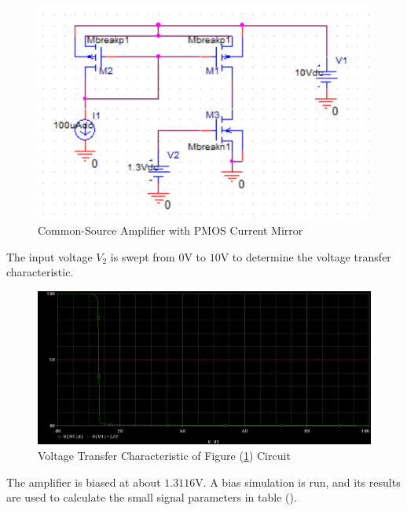 \FloatBarrier

\begin{figure}[h!]
	\centering
	\includegraphics[scale=0.75]{../images/circuit2.PNG}
	\caption{Common-Source Amplifier with PMOS Current Mirror}
	\label{fig:circuit2}
\end{figure}

\FloatBarrier

The input voltage $V_2$ is swept from $0$\si{\volt} to $10$\si{\volt} to determine the voltage transfer characteristic.

\FloatBarrier

\begin{figure}[h!]
	\centering
	\includegraphics[scale=0.75]{../images/circuit2_dc_sweep.PNG}
	\caption{Voltage Transfer Characteristic of Figure (\ref{fig:circuit2}) Circuit}
	\label{fig:circuit2_dc_sweep}
\end{figure}

\FloatBarrier

The amplifier is biased at about $1.3116$\si{\volt}. A bias simulation is run, and its results are used to calculate the small signal parameters in table ().

